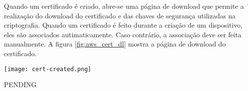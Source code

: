 Quando um certificado é criado, abre-se uma página de download que permite a
realização do download do certificado e das chaves de segurança utilizadas na
criptografia. Quando um certificado é feito durante a criação de um dispositivo,
eles são associados autimaticamente. Caso contrário, a associação deve ser feita
manualmente. A figura \ref{fig:aws_cert_dl} mostra a página de download do
certificado.

\begin{center}
	\centering 
	\texttt{[image: cert-created.png]}
	\label{fig:aws_cert_dl}
\end{center} 



PENDING


